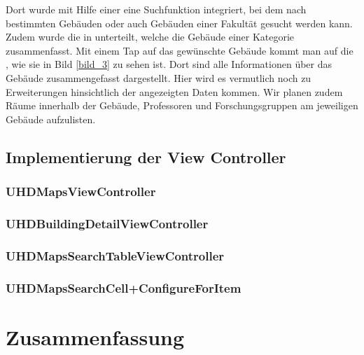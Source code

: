\documentclass{report}
\begin{document}
Dort wurde mit Hilfe einer  eine Suchfunktion integriert, bei dem nach bestimmten Gebäuden oder auch Gebäuden einer Fakultät gesucht werden kann. Zudem wurde die  in  unterteilt, welche die Gebäude einer Kategorie zusammenfasst. Mit einem Tap auf das gewünschte Gebäude kommt man auf die , wie sie in Bild \ref{bild_3} zu sehen ist. Dort sind alle Informationen über das Gebäude zusammengefasst dargestellt. Hier wird es vermutlich noch zu Erweiterungen hinsichtlich der angezeigten Daten kommen. Wir planen zudem Räume innerhalb der Gebäude, Professoren und Forschungsgruppen am jeweiligen Gebäude aufzulisten.

\section{Implementierung der View Controller}

\subsection{UHDMapsViewController}

\subsection{UHDBuildingDetailViewController}

\subsection{UHDMapsSearchTableViewController} \label{subsection_1}

\subsection{UHDMapsSearchCell+ConfigureForItem}


\newpage
\chapter{Zusammenfassung}
\end{document}
